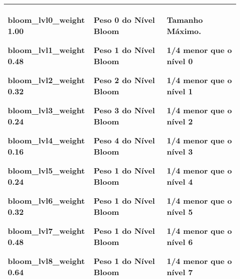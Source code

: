 \documentclass[letterpaper,10pt,brazil]{sphinxmanual}
\begin{document}
\begin{tabular}{|p{0.317\linewidth}|p{0.317\linewidth}|p{0.317\linewidth}|}
\begin{DUlineblock}{0em}
\item[] bloom\_lvl0\_weight    1.00
\item[] bloom\_lvl1\_weight    0.48
\item[] bloom\_lvl2\_weight    0.32
\item[] bloom\_lvl3\_weight    0.24
\item[] bloom\_lvl4\_weight    0.16
\item[] bloom\_lvl5\_weight    0.24
\item[] bloom\_lvl6\_weight    0.32
\item[] bloom\_lvl7\_weight    0.48
\item[] bloom\_lvl8\_weight    0.64
\end{DUlineblock}
&
\begin{DUlineblock}{0em}
\item[] Peso 0 do Nível Bloom
\item[] Peso 1 do Nível Bloom
\item[] Peso 2 do Nível Bloom
\item[] Peso 3 do Nível Bloom
\item[] Peso 4 do Nível Bloom
\item[] Peso 1 do Nível Bloom
\item[] Peso 1 do Nível Bloom
\item[] Peso 1 do Nível Bloom
\item[] Peso 1 do Nível Bloom
\end{DUlineblock}
&
\begin{DUlineblock}{0em}
\item[] Tamanho Máximo.
\item[] 1/4 menor que o nível 0
\item[] 1/4 menor que o nível 1
\item[] 1/4 menor que o nível 2
\item[] 1/4 menor que o nível 3
\item[] 1/4 menor que o nível 4
\item[] 1/4 menor que o nível 5
\item[] 1/4 menor que o nível 6
\item[] 1/4 menor que o nível 7
\end{DUlineblock}
\\
\hline\end{tabular}
\end{document}
